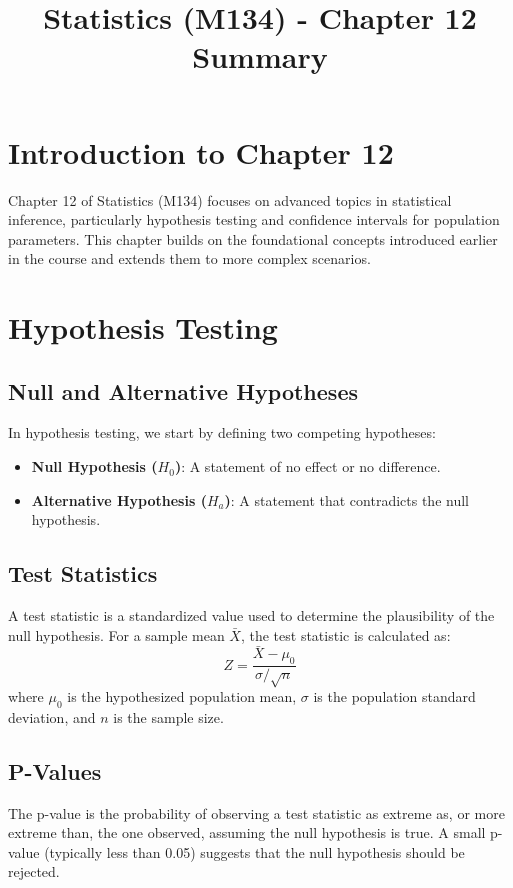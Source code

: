 \documentclass{article}
\title{Statistics (M134) - Chapter 12 Summary}
\author{}
\date{}
\begin{document}
\maketitle

\section{Introduction to Chapter 12}
Chapter 12 of Statistics (M134) focuses on advanced topics in statistical inference, particularly hypothesis testing and confidence intervals for population parameters. This chapter builds on the foundational concepts introduced earlier in the course and extends them to more complex scenarios.

\section{Hypothesis Testing}
\subsection{Null and Alternative Hypotheses}
In hypothesis testing, we start by defining two competing hypotheses:
\begin{itemize}
    \item \textbf{Null Hypothesis ($H_0$)}: A statement of no effect or no difference.
    \item \textbf{Alternative Hypothesis ($H_a$)}: A statement that contradicts the null hypothesis.
\end{itemize}

\subsection{Test Statistics}
A test statistic is a standardized value used to determine the plausibility of the null hypothesis. For a sample mean $\bar{X}$, the test statistic is calculated as:
\[
Z = \frac{\bar{X} - \mu_0}{\sigma / \sqrt{n}}
\]
where $\mu_0$ is the hypothesized population mean, $\sigma$ is the population standard deviation, and $n$ is the sample size.

\subsection{P-Values}
The p-value is the probability of observing a test statistic as extreme as, or more extreme than, the one observed, assuming the null hypothesis is true. A small p-value (typically less than 0.05) suggests that the null hypothesis should be rejected.
\end{document}
